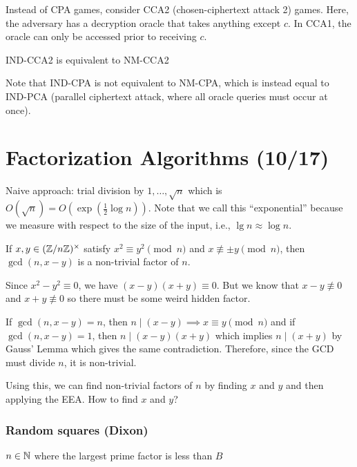 \documentclass[notes]{agony}
\newcommand{\mgrp}[1]{(\Z/#1\Z)^\times}
\begin{document}
Instead of CPA games, consider CCA2 (chosen-ciphertext attack 2) games.
Here, the adversary has a decryption oracle that takes anything except $c$.
In CCA1, the oracle can only be accessed prior to receiving $c$.

\begin{theorem}
  IND-CCA2 is equivalent to NM-CCA2
\end{theorem}

Note that IND-CPA is not equivalent to NM-CPA,
which is instead equal to IND-PCA (parallel ciphertext attack,
where all oracle queries must occur at once).

\section{Factorization Algorithms (10/17)}

Naive approach: trial division by $1,\dotsc,\sqrt{n}$ which is $O(\sqrt{n}) = O(\exp(\frac12\log n))$.
Note that we call this ``exponential'' because we measure with respect
to the size of the input, i.e., $\lg n \approx \log n$.

\begin{prop}
  If $x,y\in \mgrp{n}$ satisfy $x^2 \equiv y^2 \pmod n$ and $x \not\equiv \pm y \pmod n$,
  then $\gcd(n, x-y)$ is a non-trivial factor of $n$.
\end{prop}
\begin{prf}
  Since $x^2 - y^2 \equiv 0$, we have $(x-y)(x+y) \equiv 0$.
  But we know that $x-y \not\equiv 0$ and $x+y \not\equiv 0$
  so there must be some weird hidden factor.

  If $\gcd(n,x-y) = n$, then $n \mid (x-y) \implies x \equiv y \pmod n$
  and if $\gcd(n,x-y) = 1$, then $n \mid (x-y)(x+y)$ which implies $n \mid (x+y)$
  by Gauss' Lemma which gives the same contradiction.
  Therefore, since the GCD must divide $n$, it is non-trivial.
\end{prf}

Using this, we can find non-trivial factors of $n$ by finding $x$ and $y$
and then applying the EEA.
How to find $x$ and $y$?

\subsubsection{Random squares (Dixon)}

\begin{defn}[$B$-smoothness]
  $n \in \mathbb{N}$ where the largest prime factor is less than $B$
\end{defn}
\end{document}
